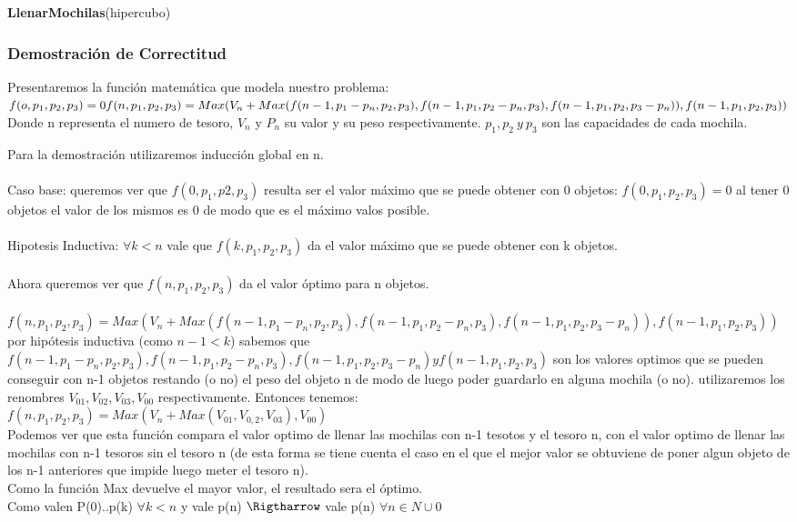 \documentclass[spanish,12pt]{article}
\begin{document}
\begin{algorithm}[H]{\textbf{LlenarMochilas}(hipercubo)}
\begin{algorithmic}[1]
\begin{algorithmic}
\subsubsection{Demostración de Correctitud}
Presentaremos la función matemática que modela nuestro problema:\\

$f(o,p_{1},p_{2},p_{3})=0 \\
f(n,p_{1},p_{2},p_{3}) = Max(V_{n}+Max(f(n-1,p_{1}-p_{n},p_{2},p_{3}), f(n-1,p_{1},p_{2}-p_{n},p_{3}), f(n-1,p_{1},p_{2},p_{3}-p_{n})),f(n-1,p_{1},p_{2},p_{3})) $
\\
Donde n representa el numero de tesoro, $V_{n}$ y $P_{n}$ su valor y su peso respectivamente. $p_{1},p_{2}\ y \ p_{3}$ son las capacidades de cada mochila. 

Para la demostración utilizaremos inducción global en n.
\\
\\
Caso base: queremos ver que $f(0,p_{1},p{2},p_{3})$ resulta ser el valor máximo que se puede obtener con 0 objetos:
$f(0,p_{1},p_{2},p_{3}) = 0$ al tener 0 objetos el valor de los mismos es 0 de modo que es el máximo valos posible. 
\\
\\
Hipotesis Inductiva: $\forall k<n$ vale que $f(k,p_{1},p_{2},p_{3})$ da el valor máximo que se puede obtener con k objetos.
\\
\\
Ahora queremos ver que $f(n,p_{1},p_{2},p_{3})$ da el valor óptimo para n objetos.
\\
\\
$f(n,p_{1},p_{2},p_{3}) = Max(V_{n}+Max(f(n-1,p_{1}-p_{n},p_{2},p_{3}), f(n-1,p_{1},p_{2}-p_{n},p_{3}), f(n-1,p_{1},p_{2},p_{3}-p_{n})),f(n-1,p_{1},p_{2},p_{3})) $ \\
por hipótesis inductiva (como $n-1 < k$) sabemos que $f(n-1,p_{1}-p_{n},p_{2},p_{3}), f(n-1,p_{1},p_{2}-p_{n},p_{3}), f(n-1,p_{1},p_{2},p_{3}-p_{n}) y f(n-1,p_{1},p_{2},p_{3})$ son los valores optimos que se pueden conseguir con n-1 objetos restando (o no) el peso del objeto n de modo de luego poder guardarlo en alguna mochila (o no). utilizaremos los renombres $V_{01},V_{02},V_{03},V_{00}$ respectivamente.
Entonces tenemos: \\
$f(n,p_{1},p_{2},p_{3})= Max(V_{n}+Max(V_{01},V_{0,2},V_{03}),V_{00})$\\
Podemos ver que esta función  compara el valor optimo de llenar las mochilas con n-1 tesotos y el tesoro n, con el valor optimo de llenar las mochilas con n-1 tesoros sin el tesoro n (de esta forma se tiene cuenta el caso en el que el mejor valor se obtuviene de poner algun objeto  de los n-1 anteriores que impide luego meter el tesoro n).\\
Como la función Max devuelve el mayor valor, el resultado sera el óptimo.
\\
Como valen P(0)..p(k) $\forall k<n$ y vale p(n) $\Rigtharrow$ vale p(n) $\forall n \in N \cup {0} $


\end{algorithmic}
\end{algorithmic}
\end{algorithm}
\end{document}
